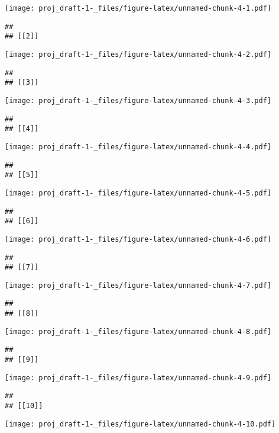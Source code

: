 \documentclass[
]{article}
\begin{document}
\texttt{[image: proj\_draft-1-\_files/figure-latex/unnamed-chunk-4-1.pdf]}

\begin{verbatim}
## 
## [[2]]
\end{verbatim}

\texttt{[image: proj\_draft-1-\_files/figure-latex/unnamed-chunk-4-2.pdf]}

\begin{verbatim}
## 
## [[3]]
\end{verbatim}

\texttt{[image: proj\_draft-1-\_files/figure-latex/unnamed-chunk-4-3.pdf]}

\begin{verbatim}
## 
## [[4]]
\end{verbatim}

\texttt{[image: proj\_draft-1-\_files/figure-latex/unnamed-chunk-4-4.pdf]}

\begin{verbatim}
## 
## [[5]]
\end{verbatim}

\texttt{[image: proj\_draft-1-\_files/figure-latex/unnamed-chunk-4-5.pdf]}

\begin{verbatim}
## 
## [[6]]
\end{verbatim}

\texttt{[image: proj\_draft-1-\_files/figure-latex/unnamed-chunk-4-6.pdf]}

\begin{verbatim}
## 
## [[7]]
\end{verbatim}

\texttt{[image: proj\_draft-1-\_files/figure-latex/unnamed-chunk-4-7.pdf]}

\begin{verbatim}
## 
## [[8]]
\end{verbatim}

\texttt{[image: proj\_draft-1-\_files/figure-latex/unnamed-chunk-4-8.pdf]}

\begin{verbatim}
## 
## [[9]]
\end{verbatim}

\texttt{[image: proj\_draft-1-\_files/figure-latex/unnamed-chunk-4-9.pdf]}

\begin{verbatim}
## 
## [[10]]
\end{verbatim}

\texttt{[image: proj\_draft-1-\_files/figure-latex/unnamed-chunk-4-10.pdf]}
\end{document}

